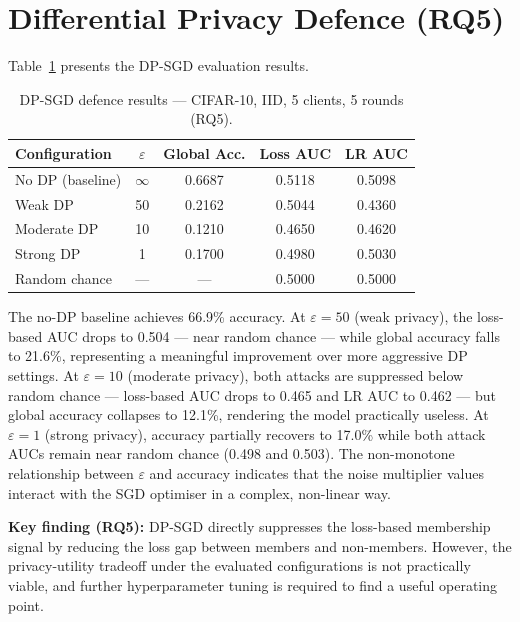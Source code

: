 \documentclass[12pt, a4paper]{report}
\begin{document}
\section{Differential Privacy Defence (RQ5)}

Table~\ref{tab:dp_results} presents the DP-SGD evaluation results.

\begin{table}[H]
  \centering
  \caption{DP-SGD defence results --- CIFAR-10, IID, 5 clients, 5 rounds (RQ5).}
  \label{tab:dp_results}
  \begin{tabular}{lcccc}
    \toprule
    \textbf{Configuration} & \textbf{$\varepsilon$} & \textbf{Global Acc.} & \textbf{Loss AUC} & \textbf{LR AUC} \\
    \midrule
    No DP (baseline)    & $\infty$ & 0.6687 & 0.5118 & 0.5098 \\
    Weak DP             & 50       & 0.2162 & 0.5044 & 0.4360 \\
    Moderate DP         & 10       & 0.1210 & 0.4650 & 0.4620 \\
    Strong DP           & 1        & 0.1700 & 0.4980 & 0.5030 \\
    \midrule
    Random chance       & ---      & ---    & 0.5000 & 0.5000 \\
    \bottomrule
  \end{tabular}
\end{table}

The no-DP baseline achieves 66.9\% accuracy. At $\varepsilon = 50$ (weak
privacy), the loss-based AUC drops to 0.504 --- near random chance --- while
global accuracy falls to 21.6\%, representing a meaningful improvement over
more aggressive DP settings. At $\varepsilon = 10$ (moderate privacy), both
attacks are suppressed below random chance --- loss-based AUC drops to 0.465
and LR AUC to 0.462 --- but global accuracy collapses to 12.1\%, rendering the
model practically useless. At $\varepsilon = 1$ (strong privacy), accuracy
partially recovers to 17.0\% while both attack AUCs remain near random chance
(0.498 and 0.503). The non-monotone relationship between $\varepsilon$ and
accuracy indicates that the noise multiplier values interact with the SGD
optimiser in a complex, non-linear way.

\textbf{Key finding (RQ5):} DP-SGD directly suppresses the loss-based membership
signal by reducing the loss gap between members and non-members. However, the
privacy-utility tradeoff under the evaluated configurations is not practically
viable, and further hyperparameter tuning is required to find a useful operating
point.
\end{document}
